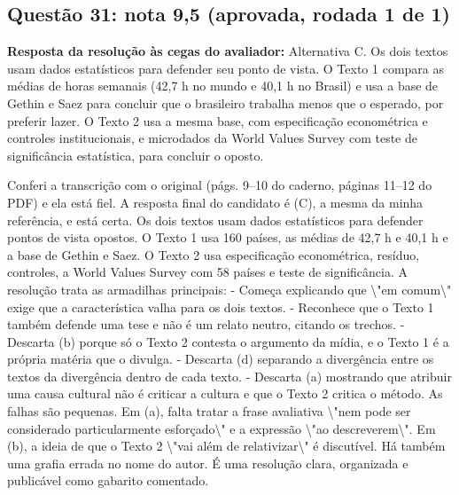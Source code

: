 \documentclass{article}%
\begin{document}
\subsection*{Questão 31: nota 9,5 (aprovada, rodada 1 de 1)}%
\textbf{Resposta da resolução às cegas do avaliador:} Alternativa C. Os dois textos usam dados estatísticos para defender seu ponto de vista. O Texto 1 compara as médias de horas semanais (42,7 h no mundo e 40,1 h no Brasil) e usa a base de Gethin e Saez para concluir que o brasileiro trabalha menos que o esperado, por preferir lazer. O Texto 2 usa a mesma base, com especificação econométrica e controles institucionais, e microdados da World Values Survey com teste de significância estatística, para concluir o oposto.\par %
Conferi a transcrição com o original (págs. 9--10 do caderno, páginas 11--12 do PDF) e ela está fiel. A resposta final do candidato é (C), a mesma da minha referência, e está certa. Os dois textos usam dados estatísticos para defender pontos de vista opostos. O Texto 1 usa 160 países, as médias de 42,7 h e 40,1 h e a base de Gethin e Saez. O Texto 2 usa especificação econométrica, resíduo, controles, a World Values Survey com 58 países e teste de significância.\newline%
\newline%
A resolução trata as armadilhas principais:\newline%
{-} Começa explicando que \textbackslash{}"em comum\textbackslash{}" exige que a característica valha para os dois textos.\newline%
{-} Reconhece que o Texto 1 também defende uma tese e não é um relato neutro, citando os trechos.\newline%
{-} Descarta (b) porque só o Texto 2 contesta o argumento da mídia, e o Texto 1 é a própria matéria que o divulga.\newline%
{-} Descarta (d) separando a divergência entre os textos da divergência dentro de cada texto.\newline%
{-} Descarta (a) mostrando que atribuir uma causa cultural não é criticar a cultura e que o Texto 2 critica o método.\newline%
\newline%
As falhas são pequenas. Em (a), falta tratar a frase avaliativa \textbackslash{}"nem pode ser considerado particularmente esforçado\textbackslash{}" e a expressão \textbackslash{}"ao descreverem\textbackslash{}". Em (b), a ideia de que o Texto 2 \textbackslash{}"vai além de relativizar\textbackslash{}" é discutível. Há também uma grafia errada no nome do autor. É uma resolução clara, organizada e publicável como gabarito comentado.%
\end{document}
